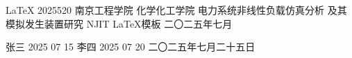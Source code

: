 \documentclass[a4paper]{njit}
\begin{document}

\cover
{\LaTeX}                         %
{2025520}                        %
{南京工程学院}                     %
{化学化工学院}                     %
{电力系统非线性负载仿真分析}               %
{及其模拟发生装置研究}                    %
{NJIT \quad \LaTeX 模板}          %
{}                               %
{二〇二五\hspace{0.4em}年\hspace{0.4em}七\hspace{0.4em}月} %



\thesisdeclaration
{张三}        %
{2025}        %
{07}          %
{15}          %
{李四}        %
{2025}        %
{07}          %
{20}          %
{二〇二五年七月二十五日} %
\newpage


\pagestyle{plain}
\pagestyle{fancy}







\clearpage

\clearpage
\end{document}
